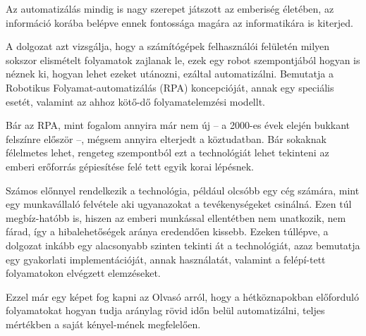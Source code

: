 
Az automatizálás mindig is nagy szerepet játszott az emberiség életében, az információ korába belépve ennek fontossága magára az informatikára is kiterjed.

A dolgozat azt vizsgálja, hogy a számítógépek felhasználói felületén milyen sokszor elismételt folyamatok zajlanak le, ezek egy robot szempontjából hogyan is néznek ki, hogyan lehet ezeket utánozni, ezáltal automatizálni. Bemutatja a Robotikus Folyamat\hyp{}automatizálás (RPA) koncepcióját, annak egy speciális esetét, valamint az ahhoz kötő\hyp{}dő folyamatelemzési modellt.

Bár az RPA, mint fogalom annyira már nem új -- a 2000-es évek elején bukkant felszínre először --, mégsem annyira elterjedt a köztudatban. Bár sokaknak félelmetes lehet, rengeteg szempontból ezt a technológiát lehet tekinteni az emberi erőforrás gépiesítése felé tett egyik korai lépésnek.

Számos előnnyel rendelkezik a technológia, például olcsóbb egy cég számára, mint egy munkavállaló felvétele aki ugyanazokat a tevékenységeket csinálná. Ezen túl megbíz\hyp{}hatóbb is, hiszen az emberi munkással ellentétben nem unatkozik, nem fárad, így a hibalehetőségek aránya eredendően kissebb.
\newline\newline
Ezeken túllépve, a dolgozat inkább egy alacsonyabb szinten tekinti át a technológiát, azaz bemutatja egy gyakorlati implementációját, annak használatát, valamint a felépí\hyp{}tett folyamatokon elvégzett elemzéseket.

Ezzel már egy képet fog kapni az Olvasó arról, hogy a hétköznapokban előforduló folyamatokat hogyan tudja aránylag rövid időn belül automatizálni, teljes mértékben a saját kényel\hyp{}mének megfelelően.